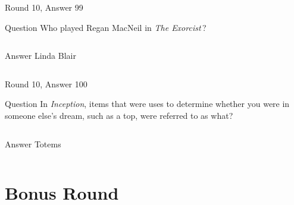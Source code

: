 \documentclass[11pt]{beamer}
\begin{document}
\begin{frame}[t]{Round 10, Answer 99}
  \vspace{2em}
  \begin{block}{Question}
    Who played Regan MacNeil in \emph{The Exorcist}\,?
  \end{block}
  \pause{}
  \begin{columns}[T,totalwidth=\linewidth]
    \begin{column}{0.35\linewidth}
      \begin{block}{Answer}
        Linda Blair
      \end{block}
    \end{column}
    \begin{column}{0.6\linewidth}
      \begin{center}
        \texttt{[image: \{Images/exorcist]}.jpeg}
      \end{center}
    \end{column}
  \end{columns}
\end{frame}


\begin{frame}[t]{Round 10, Answer 100}
  \vspace{2em}
  \begin{block}{Question}
    In \emph{Inception}, items that were uses to determine whether you were in someone else's dream, such as a top, were referred to as what?
  \end{block}
  \pause{}
  \begin{columns}[T,totalwidth=\linewidth]
    \begin{column}{0.35\linewidth}
      \begin{block}{Answer}
        Totems
      \end{block}
    \end{column}
    \begin{column}{0.6\linewidth}
      \begin{center}
        \texttt{[image: \{Images/totem]}.jpg}
      \end{center}
    \end{column}
  \end{columns}
\end{frame}


\section{Bonus Round}
\end{document}
